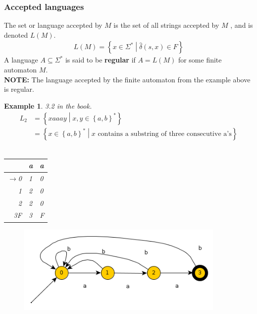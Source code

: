 \documentclass[a4paper]{article}
\newtheorem{example}{Example}
\begin{document}
\subsubsection{Accepted languages}
The set or language accepted by $M$ is the set of all strings accepted by $M$
, and is denoted $L(M)$.
\begin{align*}
    L(M)=\left\{ x\in\Sigma^*\middle | \hat{\delta}(s,x)\in F \right\}
\end{align*}
A language $A\subseteq \Sigma^*$ is said to be \textbf{regular} if $A=L(M)$
for some finite automaton $M$.\\
\textbf{NOTE:} The language accepted by the finite automaton from the example
above is regular.
\begin{example}
    3.2 in the book.\\
    \begin{align*}
        L_2&=\left\{ xaaay \middle | x,y\in \left\{ a,b \right\}^* \right\}\\
        &=\left\{ x\in\left\{ a,b \right\}^* \middle | x 
        \mbox{ contains a substring of three consecutive a's} \right\}
    \end{align*}\\
    \begin{table}[H]
        \centering
        \begin{tabular}{r|l l}
            & a & a
            \\\hline
            $\rightarrow$0 & 1 & 0\\
            1 & 2 & 0\\
            2 & 2 & 0\\
            3F & 3 & F
        \end{tabular}
    \end{table}
    \begin{figure}[H]
        \centering
        \includegraphics[width=0.9\textwidth]{example3-2.png}
    \end{figure}
\end{example}
\end{document}
